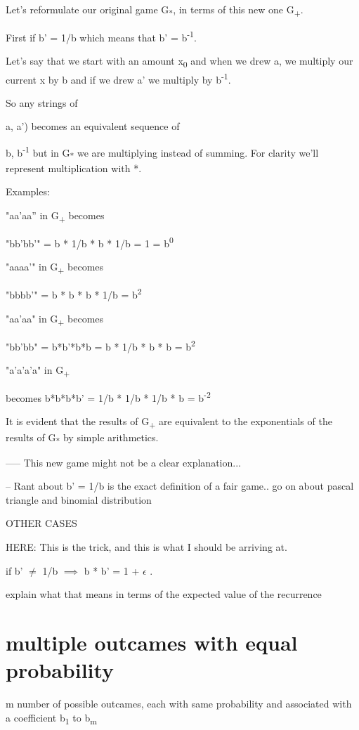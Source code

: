 \documentclass[12pt,reqno]{amsart}
\begin{document}
Let's reformulate our original game G\textsubscript{*},  in terms of this new one G\textsubscript{+}.

First if b' = 1/b which means that b' = b\textsuperscript{-1}.

Let's say that we start with an amount x\textsubscript{0} and when we drew a, we multiply our current x by b and if we drew a' we multiply by b\textsuperscript{-1}.

So any strings of {a, a') becomes an equivalent sequence of {b, b\textsuperscript{-1} but in G\textsubscript{*} we are multiplying instead of summing. For clarity we'll represent multiplication with *.

Examples: 

"aa'aa'' in G\textsubscript{+} becomes

"bb'bb'" = b * 1/b * b * 1/b = 1 = b\textsuperscript{0}

"aaaa'" in G\textsubscript{+} becomes

"bbbb'" = b * b * b * 1/b = b\textsuperscript{2}

"aa'aa" in G\textsubscript{+} becomes

"bb'bb" = b*b'*b*b = b * 1/b * b * b = b\textsuperscript{2}

"a'a'a'a" in G\textsubscript{+}

becomes b*b*b*b' = 1/b * 1/b * 1/b * b = b\textsuperscript{-2}

It is evident that the results of G\textsubscript{+} are equivalent to the 
exponentials of the results of G\textsubscript{*} by simple arithmetics.

----- This new game might not be a clear explanation... 

-- Rant about b' = 1/b is the exact definition of a fair game.. go on about pascal triangle and binomial distribution


OTHER CASES

HERE: This is the trick, and this is what I should be arriving at.

if b' $\neq$ 1/b  $\implies$  b * b' = 1 + $\epsilon$ .

explain what that means in terms of the expected value of the recurrence


\section{multiple outcames with equal probability}

m number of possible outcames, each with same probability and associated with a coefficient b\textsubscript{1} to b\textsubscript{m}



}}
\end{document}
